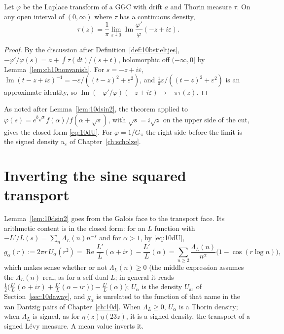\begin{theorem}\label{thm:lapstieltjes}
Let $\varphi$ be the Laplace transform of a GGC with drift $a$ and Thorin measure $\tau$. On any open interval of $(0,\infty)$ where $\tau$ has a continuous density,
\[
\tau(z)=\frac1\pi\lim_{\varepsilon\downarrow0}\operatorname{Im}\frac{\varphi'}{\varphi}(-z+i\varepsilon).
\]
\end{theorem}

\begin{proof}
By the discussion after Definition~\ref{def:10bstieltjes}, $-\varphi'/\varphi(s)=a+\int\tau(dt)/(s+t)$, holomorphic off $(-\infty,0]$ by Lemma~\ref{lem:ch10nonvanish}. For $s=-z+i\varepsilon$, $\operatorname{Im}(t-z+i\varepsilon)^{-1}=-\varepsilon/((t-z)^2+\varepsilon^2)$, and $\frac1\pi\varepsilon/((t-z)^2+\varepsilon^2)$ is an approximate identity, so $\operatorname{Im}(-\varphi'/\varphi)(-z+i\varepsilon)\to-\pi\tau(z)$.
\end{proof}

As noted after Lemma~\ref{lem:10dsin2}, the theorem applied to $\varphi(s)=e^{b\sqrt s}f(\alpha)/f(\alpha+\sqrt s)$, with $\sqrt s=i\sqrt z$ on the upper side of the cut, gives the closed form \eqref{eq:10dU}. For $\varphi=1/G_\pi$ the right side before the limit is the signed density $u_\varepsilon$ of Chapter~\ref{ch:scholze}.

\section{Inverting the sine squared transport}\label{sec:lapbohr}

Lemma~\ref{lem:10dsin2} goes from the Galois face to the transport face. Its arithmetic content is in the closed form: for an $L$ function with $-L'/L(s)=\sum_n\Lambda_L(n)n^{-s}$ and for $\alpha>1$, by \eqref{eq:10dU},
\begin{equation}\label{eq:lapg}
g_\alpha(r):=2\pi r\,U_\alpha(r^2)=\operatorname{Re}\frac{L'}L(\alpha+ir)-\frac{L'}L(\alpha)=\sum_{n\ge2}\frac{\Lambda_L(n)}{n^\alpha}\bigl(1-\cos(r\log n)\bigr),
\end{equation}
which makes sense whether or not $\Lambda_L(n)\ge0$ (the middle expression assumes the $\Lambda_L(n)$ real, as for a self dual $L$; in general it reads $\frac12\bigl(\frac{L'}L(\alpha+ir)+\frac{L'}L(\alpha-ir)\bigr)-\frac{L'}L(\alpha)$); $U_\alpha$ is the density $U_{\mathrm{ar}}$ of Section~\ref{sec:10daway}, and $g_\alpha$ is unrelated to the function of that name in the van Dantzig pairs of Chapter~\ref{ch:10d}. When $\Lambda_L\ge0$, $U_\alpha$ is a Thorin density; when $\Lambda_L$ is signed, as for $\eta(z)\eta(23z)$, it is a signed density, the transport of a signed L\'evy measure. A mean value inverts it.

